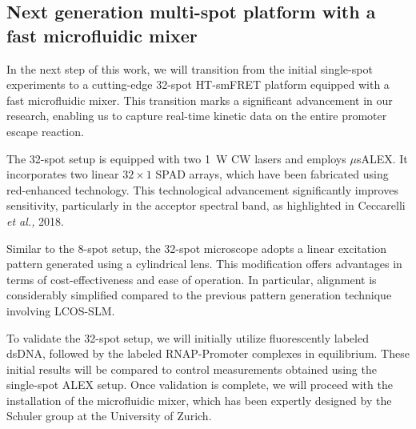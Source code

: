 \subsection{Next generation multi-spot platform with a fast microfluidic mixer}
\label{sec:32-spot_intro}

In the next step of this work, we will transition from the initial single-spot experiments to a cutting-edge 32-spot \ac{HT-smFRET} platform equipped with a fast microfluidic mixer. 
This transition marks a significant advancement in our research, enabling us to capture real-time kinetic data on the entire promoter escape reaction.

The 32-spot setup is equipped with two 1~W \ac{CW} lasers and employs $\mu$s\ac{ALEX}. 
It incorporates two linear $32\times1$ \ac{SPAD} arrays, which have been fabricated using red-enhanced technology. 
This technological advancement significantly improves sensitivity, particularly in the acceptor spectral band, as highlighted in Ceccarelli \textit{et al.,} 2018\cite{ceccarelli_IEEEPTL_2018}.

Similar to the 8-spot setup, the 32-spot microscope adopts a linear excitation pattern generated using a cylindrical lens. 
This modification offers advantages in terms of cost-effectiveness and ease of operation. In particular, alignment is considerably simplified compared to the previous pattern generation technique involving \ac{LCOS-SLM}.

To validate the 32-spot setup, we will initially utilize fluorescently labeled \ac{dsDNA}, followed by the labeled RNAP-Promoter complexes in equilibrium. 
These initial results will be compared to control measurements obtained using the single-spot \ac{ALEX} setup. 
Once validation is complete, we will proceed with the installation of the microfluidic mixer, which has been expertly designed by the Schuler group at the University of Zurich.

